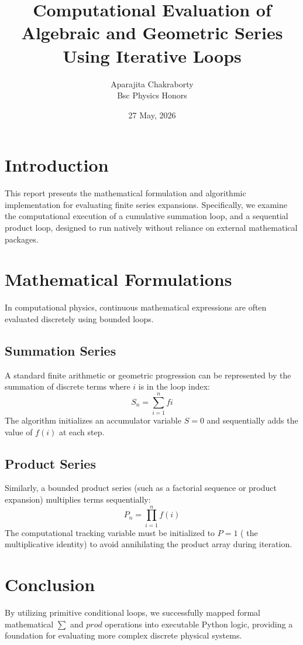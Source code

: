 \documentclass[11pt]{article}
\title{\textbf{Computational Evaluation of Algebraic and Geometric Series Using Iterative Loops}}
\author{Aparajita Chakraborty \\ Bsc Physics Honors}
\date{27 May, 2026 }
\begin{document}
\maketitle

\section{Introduction}
This report presents the mathematical formulation and algorithmic implementation for evaluating finite series expansions. Specifically, we examine the computational execution of a cumulative summation loop, and a sequential product loop, designed to run natively without reliance on external mathematical packages.

\section{Mathematical Formulations}
In computational physics, continuous mathematical expressions are often evaluated discretely using bounded loops.

\subsection{Summation Series}
A standard finite arithmetic or geometric progression can be represented by the summation of discrete terms where $i$ is in the loop index:
\begin{equation}
	S_n = \sum_{i=1}^{n} f{i}
\end{equation}
The algorithm initializes an accumulator variable $S = 0$ and sequentially adds the value of $f(i)$ at each step.

\subsection{Product Series}
Similarly, a bounded product series (such as a factorial sequence or product expansion) multiplies terms sequentially:
\begin{equation}
	P_n = \prod_{i=1}^{n} f(i)
\end{equation}
The computational tracking variable must be initialized to $P = 1$ ( the multiplicative identity) to avoid annihilating the product array during iteration.

\section{Conclusion}
By utilizing primitive conditional loops, we successfully mapped formal mathematical $\sum$ and $prod$ operations into executable Python logic, providing a foundation for evaluating more complex discrete physical systems.
\end{document}
